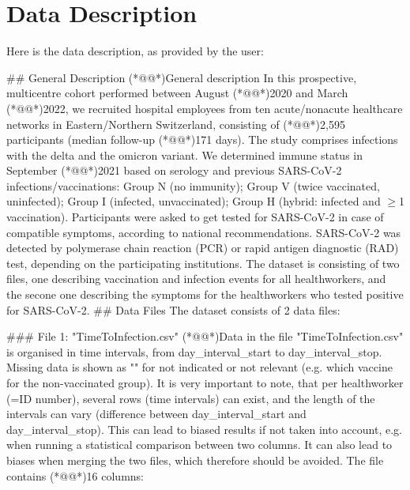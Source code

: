 \documentclass[11pt]{article}
\begin{document}




\clearpage
\appendix

\section{Data Description} \label{sec:data_description} Here is the data description, as provided by the user:

\begin{codeoutput}
\#\# General Description
(*@@*)General description 
In this prospective, multicentre cohort performed between August (*@@*)2020 and March (*@@*)2022, we recruited hospital employees from ten acute/nonacute healthcare networks in Eastern/Northern Switzerland, consisting of (*@@*)2,595 participants (median follow-up (*@@*)171 days). The study comprises infections with the delta and the omicron variant. We determined immune status in September (*@@*)2021 based on serology and previous SARS-CoV-2 infections/vaccinations: Group N (no immunity); Group V (twice vaccinated, uninfected); Group I (infected, unvaccinated); Group H (hybrid: infected and $\geq$1 vaccination). Participants were asked to get tested for SARS-CoV-2 in case of compatible symptoms, according to national recommendations. SARS-CoV-2 was detected by polymerase chain reaction (PCR) or rapid antigen diagnostic (RAD) test, depending on the participating institutions. The dataset is consisting of two files, one describing vaccination and infection events for all healthworkers, and the secone one describing the symptoms for the healthworkers who tested positive for SARS-CoV-2.
\#\# Data Files
The dataset consists of 2 data files:

\#\#\# File 1: "TimeToInfection.csv"
(*@@*)Data in the file "TimeToInfection.csv" is organised in time intervals, from day\_interval\_start to day\_interval\_stop. Missing data is shown as "" for not indicated or not relevant (e.g. which vaccine for the non-vaccinated group). It is very important to note, that per healthworker (=ID number), several rows (time intervals) can exist, and the length of the intervals can vary (difference between day\_interval\_start and day\_interval\_stop). This can lead to biased results if not taken into account, e.g. when running a statistical comparison between two columns. It can also lead to biases when merging the two files, which therefore should be avoided. The file contains (*@@*)16 columns:


\end{codeoutput}
\end{document}
